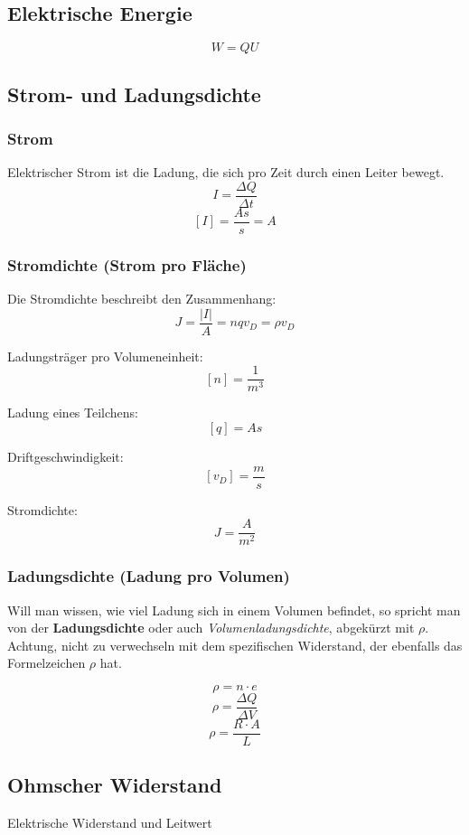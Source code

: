 \documentclass[a4paper,12pt]{article}
\begin{document}
    \subsection{Elektrische Energie}
    $$W = Q U$$
    
    \subsection{Strom- und Ladungsdichte}
    
    \subsubsection{Strom}
    Elektrischer Strom ist die Ladung, die sich pro Zeit durch einen Leiter bewegt.
    $$I = \frac{\Delta Q}{\Delta t}$$
    $$[I] = \frac{As}{s} = A$$
    
    \subsubsection{Stromdichte (Strom pro Fläche)}
    Die Stromdichte beschreibt den Zusammenhang:
    $$J = \frac{|I|}{A} = n q v_D = \rho v_D$$
    
    Ladungsträger pro Volumeneinheit:
    $$[n] = \frac{1}{m^3}$$
    
    Ladung eines Teilchens:
    $$[q] = As$$
    
    Driftgeschwindigkeit:
    $$[v_D] = \frac{m}{s}$$
    
    Stromdichte:
    $$J = \frac{A}{m^2}$$
    
    \subsubsection{Ladungsdichte (Ladung pro Volumen)}
    Will man wissen, wie viel Ladung sich in einem Volumen befindet, so spricht man von der \textbf{Ladungsdichte} oder auch \textit{Volumenladungsdichte}, abgekürzt mit $\rho$. Achtung, nicht zu verwechseln mit dem spezifischen Widerstand, der ebenfalls das Formelzeichen $\rho$ hat.
    
    $$\rho = n \cdot e$$
    $$\rho = \frac{\Delta Q}{\Delta V}$$
    $$\rho = \frac{R \cdot A}{L}$$
    
    \subsection{Ohmscher Widerstand}
    Elektrische Widerstand und Leitwert
    
\end{document}
